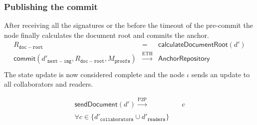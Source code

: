 \subsubsection{Publishing the commit}
\begin{comment}
For each signature that the node receives from $\mathsf{send}$, it first validates the signature
\newenvironment{rcases}
  {\left.\begin{aligned}}
  {\end{aligned}\right\rbrace}
  
\begin{equation}
    \begin{rcases}
        \mathsf{validateSignature}(c, R_{\mathtt{signing}}, s)  = 1\\
        {d'}_{\mathtt{signatures}[c]} = s
    \end{rcases}
    \quad \forall (c, s)  S
\end{equation}
\end{comment}
After receiving all the signatures or the before the timeout of the pre-commit the node finally calculates the document root and commits the anchor.
\begin{eqnarray}
R_{\mathtt{doc-root}} & = & \mathsf{calculateDocumentRoot}(d')\\
  \mathsf{commit}(d'_{\mathtt{next-img}}, R_{\mathtt{doc-root}},M_{\texttt{proofs}}) &\xrightarrow[]{\text{ETH}}& \mathsf{AnchorRepository}\\ 
  \end{eqnarray}
The state update is now considered complete and the node $\iota$ sends an update to all collaborators and readers.

\begin{equation}
\begin{split}
    \mathsf{sendDocument}(d') \xrightarrow[]{\text{P2P}}&\quad c \\ \forall c \in   \{ {d'}_{\texttt{collaborators}} \cup {d'}_{\texttt{readers}} \}
    \end{split}
\end{equation}
